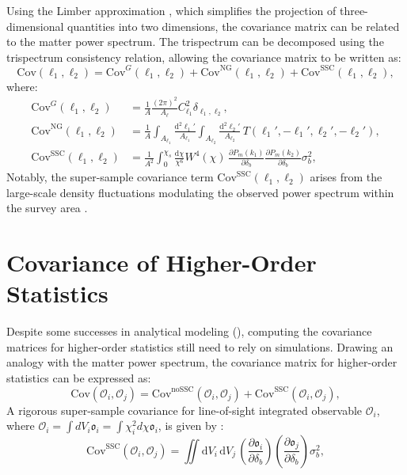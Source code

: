 Using the Limber approximation \citep{1954ApJ...119..655L}, which simplifies the projection of three-dimensional quantities into two dimensions, the covariance matrix can be related to the matter power spectrum. The trispectrum can be decomposed using the trispectrum consistency relation, allowing the covariance matrix to be written as:
\begin{equation}
    \mathrm{Cov}(\ell_1, \ell_2) = \mathrm{Cov}^{G}(\ell_1, \ell_2) + \mathrm{Cov}^{\text{NG}}(\ell_1, \ell_2) + \mathrm{Cov}^{\mathrm{SSC}}(\ell_1, \ell_2),
\end{equation}
where:
\begin{align}
    \mathrm{Cov}^{G}(\ell_1, \ell_2) &= \frac{1}{A} \frac{(2\pi)^2}{A_\ell} C_{\ell_1}^2 \delta_{\ell_1, \ell_2},\\
    \mathrm{Cov}^{\text{NG}}(\ell_1, \ell_2) &= \frac{1}{A} \int_{A_{\ell_1}} \frac{\mathrm{d}^2 \ell_1'}{A_{\ell_1}} \int_{A_{\ell_2}} \frac{\mathrm{d}^2 \ell_2'}{A_{\ell_2}} \, T(\boldsymbol{\ell}_1', -\boldsymbol{\ell}_1', \boldsymbol{\ell}_2', -\boldsymbol{\ell}_2'),\\
    \mathrm{Cov}^{\mathrm{SSC}}(\ell_1, \ell_2) &= \frac{1}{A^2} \int_0^{\chi_s} \frac{\mathrm{d} \chi}{\chi^6} W^4(\chi) \, \frac{\partial P_{m}(k_1)}{\partial \delta_b} \frac{\partial P_{m}(k_2)}{\partial \delta_b} \sigma_b^2,
\end{align}
Notably, the super-sample covariance term \( \mathrm{Cov}^{\mathrm{SSC}}(\ell_1, \ell_2) \) arises from the large-scale density fluctuations modulating the observed power spectrum within the survey area \citep{PhysRevD.87.123504}.

\section{Covariance of Higher-Order Statistics}
Despite some successes in analytical modeling (\citealt{2018PhRvD..97d3532C, 2018A&A...611A..83L, 2019A&A...624A..61L, 2023OJAp....6E...1U}), computing the covariance matrices for higher-order statistics  still need to rely on simulations. Drawing an analogy with the matter power spectrum, the covariance matrix for higher-order statistics can be expressed as:
\begin{equation}
    \mathrm{Cov}(\mathcal{O}_i, \mathcal{O}_j) = \mathrm{Cov}^{\mathrm{noSSC}}(\mathcal{O}_i, \mathcal{O}_j) + \mathrm{Cov}^{\mathrm{SSC}}(\mathcal{O}_i, \mathcal{O}_j),
\end{equation}
A rigorous super-sample covariance for line-of-sight integrated observable $\mathcal{O}_i$, where $\mathcal{O}_i = \int dV_i \mathfrak{o}_i = \int \chi_i^2 d\chi \mathfrak{o}_i$, is given by \citep{2016JCAP...08..005L}:
\begin{equation}
    \mathrm{Cov}^{\mathrm{SSC}}(\mathcal{O}_i, \mathcal{O}_j) = 
    \iint \mathrm{d}V_i \, \mathrm{d}V_j \,
    \left(
        \frac{\partial \mathfrak{o}_i}{\partial \delta_b}
    \right)
    \left(
        \frac{\partial \mathfrak{o}_j}{\partial \delta_b}
    \right)
    \sigma_b^2, 
\end{equation}